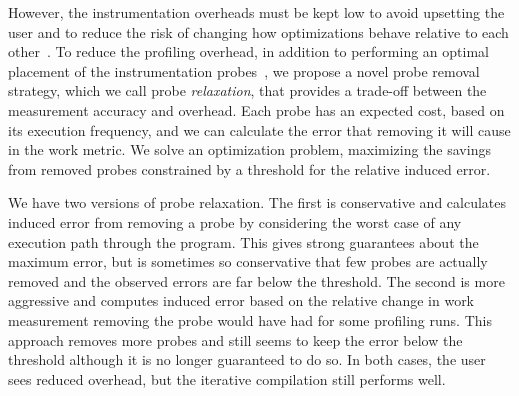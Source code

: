     However, the instrumentation overheads must be kept low to avoid upsetting the user and to reduce the risk
    of changing how optimizations behave relative to each other~\cite{forman81,anderson97,duesterwald00}.
    To reduce the profiling overhead, in addition to performing an optimal placement of the instrumentation probes~\cite{knuth73,forman81,ball94},
    we propose a novel probe removal strategy, which we call probe \textit{relaxation}, that provides a trade-off between the measurement accuracy and overhead.
    Each probe has an expected cost, based on its execution frequency, and we can calculate the error that removing it will cause in the work metric.
    We solve an optimization problem, maximizing the savings from removed probes constrained by a threshold for the relative induced error.

    We have two versions of probe relaxation. The first is conservative and calculates induced error from removing a probe by considering
    the worst case of any execution path through the program. This gives strong guarantees about the maximum error, but is sometimes so
    conservative that few probes are actually removed and the observed errors are far below the threshold. The second is more aggressive and
    computes induced error based on the relative change in work measurement removing the probe would have had for some profiling runs. This
    approach removes more probes and still seems to keep the error below the threshold although it is no longer guaranteed to do so. In
    both cases, the user sees reduced overhead, but the iterative compilation still performs well.

